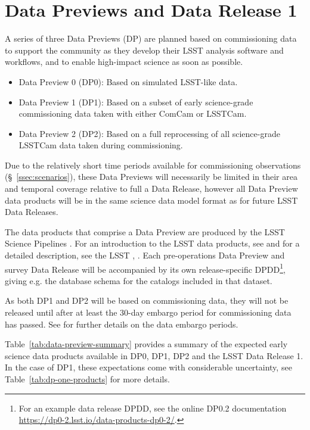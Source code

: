 \section{Data Previews and Data Release 1} 
\label{sec:datapreview}

A series of three Data Previews (DP) are planned  based on commissioning data to support the community as they develop their LSST analysis software and workflows, and to enable high-impact science as soon as possible.
\begin{itemize}
\item Data Preview 0 (DP0): Based on simulated LSST-like data.
\item Data Preview 1 (DP1): Based on a subset of early science-grade commissioning data taken with either ComCam or LSSTCam.
\item Data Preview 2 (DP2): Based on a full reprocessing of all science-grade LSSTCam data taken during commissioning.
\end{itemize}

Due to the relatively short time periods available for commissioning observations (\S~\ref{ssec:scenarios}), these Data Previews will necessarily be limited in their area and temporal coverage relative to full a Data Release, however all Data Preview data products will be in the same science data model format as for future LSST Data Releases.

The data products that comprise a Data Preview are produced by the LSST Science Pipelines \citep{2019ASPC..523..521B,2018PASJ...70S...5B}.
For an introduction to the LSST data products, see \citet{RubinDataProductsAbridged} and for a detailed description, see the LSST \dpdd{},  .
Each pre-operations Data Preview and survey Data Release will be accompanied by its own release-specific DPDD\footnote{For an example data release DPDD, see the online DP0.2 documentation {\url{https://dp0-2.lsst.io/data-products-dp0-2/}}.}, giving e.g. the  database schema for the catalogs included in that dataset.

As both DP1 and DP2 will be based on commissioning data, they will not be released until after at least the 30-day embargo period for commissioning data has passed.
See  for further details on the data embargo periods.

Table~\ref{tab:data-preview-summary} provides a summary of the expected early science data products available in DP0, DP1, DP2 and the LSST Data Release 1.
In the case of DP1, these expectations come with considerable uncertainty, see Table~\ref{tab:dp-one-products} for more details.

